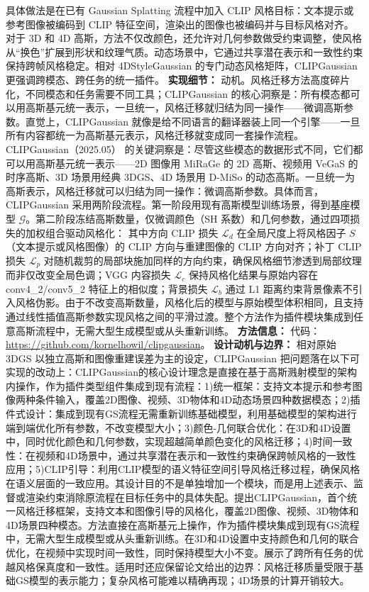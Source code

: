 具体做法是在已有 Gaussian Splatting 流程中加入 CLIP 风格目标：文本提示或参考图像被编码到 CLIP 特征空间，渲染出的图像也被编码并与目标风格对齐。对于 3D 和 4D 高斯，方法不仅改颜色，还允许对几何参数做受约束调整，使风格从“换色”扩展到形状和纹理气质。动态场景中，它通过共享潜在表示和一致性约束保持跨帧风格稳定。相对 4DStyleGaussian 的专门动态风格矩阵，CLIPGaussian 更强调跨模态、跨任务的统一插件。
\textbf{实现细节：} 动机。风格迁移方法高度碎片化，不同模态和任务需要不同工具；CLIPGaussian 的核心洞察是：所有模态都可以用高斯基元统一表示，一旦统一，风格迁移就归结为同一操作——微调高斯参数。直觉上，CLIPGaussian 就像是给不同语言的翻译器装上同一个引擎——一旦所有内容都统一为高斯基元表示，风格迁移就变成同一套操作流程。CLIPGaussian（2025.05） 的关键洞察是：尽管这些模态的数据形式不同，它们都可以用高斯基元统一表示——2D 图像用 MiRaGe 的 2D 高斯、视频用 VeGaS 的时序高斯、3D 场景用经典 3DGS、4D 场景用 D-MiSo 的动态高斯。一旦统一为高斯表示，风格迁移就可以归结为同一操作：微调高斯参数。具体而言，CLIPGaussian 采用两阶段流程。第一阶段用现有高斯模型训练场景，得到基座模型 $\mathcal{G}$。第二阶段冻结高斯数量，仅微调颜色（SH 系数）和几何参数，通过四项损失的加权组合驱动风格化： 其中方向 CLIP 损失 $\mathcal{L}_d$ 在全局尺度上将风格因子 $S$（文本提示或风格图像）的 CLIP 方向与重建图像的 CLIP 方向对齐；补丁 CLIP 损失 $\mathcal{L}_p$ 对随机裁剪的局部块施加同样的方向约束，确保风格细节渗透到局部纹理而非仅改变全局色调；VGG 内容损失 $\mathcal{L}_c$ 保持风格化结果与原始内容在 conv4\_2/conv5\_2 特征上的相似度；背景损失 $\mathcal{L}_b$ 通过 L1 距离约束背景像素不引入风格伪影。由于不改变高斯数量，风格化后的模型与原始模型体积相同，且支持通过线性插值高斯参数实现风格之间的平滑过渡。整个方法作为插件模块集成到任意高斯流程中，无需大型生成模型或从头重新训练。
\textbf{方法信息：} 代码：\url{https://github.com/kornelhowil/clipgaussian}。
\textbf{设计动机与边界：} 相对原始 3DGS 以独立高斯和图像重建误差为主的设定，CLIPGaussian 把问题落在以下可实现的改动上：CLIPGaussian的核心设计理念是直接在基于高斯溅射模型的架构内操作，作为插件类型组件集成到现有流程：1)统一框架：支持文本提示和参考图像两种条件输入，覆盖2D图像、视频、3D物体和4D动态场景四种数据模态；2)插件式设计：集成到现有GS流程无需重新训练基础模型，利用基础模型的架构进行端到端优化所有参数，不改变模型大小；3)颜色-几何联合优化：在3D和4D设置中，同时优化颜色和几何参数，实现超越简单颜色变化的风格迁移；4)时间一致性：在视频和4D场景中，通过共享潜在表示和一致性约束确保跨帧风格的一致性应用；5)CLIP引导：利用CLIP模型的语义特征空间引导风格迁移过程，确保风格在语义层面的一致应用。其设计目的不是单独增加一个模块，而是用上述表示、监督或渲染约束消除原流程在目标任务中的具体失配。提出CLIPGaussian，首个统一风格迁移框架，支持文本和图像引导的风格化，覆盖2D图像、视频、3D物体和4D场景四种模态。方法直接在高斯基元上操作，作为插件模块集成到现有GS流程中，无需大型生成模型或从头重新训练。在3D和4D设置中支持颜色和几何的联合优化，在视频中实现时间一致性，同时保持模型大小不变。展示了跨所有任务的优越风格保真度和一致性。适用时还应保留论文给出的边界：风格迁移质量受限于基础GS模型的表示能力；复杂风格可能难以精确再现；4D场景的计算开销较大。
